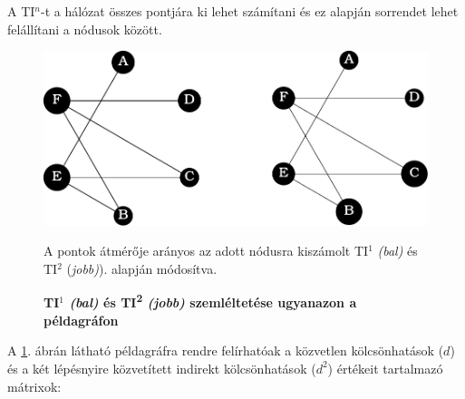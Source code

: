 \documentclass[a4paper,12pt]{article}
\begin{document}
	A TI$^n$-t a hálózat összes pontjára ki lehet számítani és ez alapján sorrendet lehet felállítani a nódusok között.

 	 \begin{figure}[H]
 		 \includegraphics[scale=1]{img/graphs.pdf}
 		 \centering
 		 \caption{\textbf{TI$^1$ \textit{(bal)} és TI\textsuperscript{2} \textit{(jobb)} szemléltetése ugyanazon a példagráfon} }
 		 A pontok átmérője arányos az adott nódusra kiszámolt TI$^1$ \textit{(bal)} és TI$^2$ (\textit{jobb)}). \cite{ti} alapján módosítva.
 		 \label{fig:peldagraph}
 	 \end{figure}

 	 \pagebreak

 	 A \ref{fig:peldagraph}. ábrán látható példagráfra rendre felírhatóak a közvetlen  kölcsönhatások ($d$) és a két lépésnyire közvetített indirekt kölcsönhatások ($d^2$) értékeit tartalmazó mátrixok:
\end{document}
